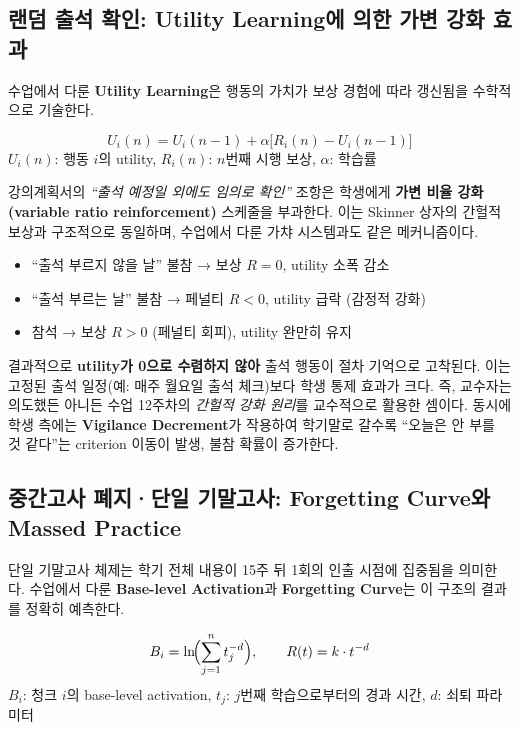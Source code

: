 \documentclass[a4paper,11pt]{article}
\begin{document}
\subsection{랜덤 출석 확인: Utility Learning에 의한 가변 강화 효과}

수업에서 다룬 \textbf{Utility Learning}은 행동의 가치가 보상 경험에 따라 갱신됨을
수학적으로 기술한다.

\begin{tcolorbox}[mybox=mainblue, title={Utility Learning}]
\[
  U_i(n) = U_i(n-1) + \alpha\bigl[R_i(n) - U_i(n-1)\bigr]
\]
$U_i(n)$: 행동 $i$의 utility, $R_i(n)$: $n$번째 시행 보상, $\alpha$: 학습률
\end{tcolorbox}

\noindent
강의계획서의 \textit{``출석 예정일 외에도 임의로 확인''} 조항은 학생에게
\textbf{가변 비율 강화(variable ratio reinforcement)} 스케줄을 부과한다. 이는 Skinner
상자의 간헐적 보상과 구조적으로 동일하며, 수업에서 다룬 가챠 시스템과도 같은 메커니즘이다.

\begin{itemize}[leftmargin=1.5em, itemsep=1pt]
  \item ``출석 부르지 않을 날'' 불참 → 보상 $R=0$, utility 소폭 감소
  \item ``출석 부르는 날'' 불참 → 페널티 $R<0$, utility 급락 (감정적 강화)
  \item 참석 → 보상 $R>0$ (페널티 회피), utility 완만히 유지
\end{itemize}

결과적으로 \textbf{utility가 0으로 수렴하지 않아} 출석 행동이 절차 기억으로 고착된다.
이는 고정된 출석 일정(예: 매주 월요일 출석 체크)보다 학생 통제 효과가 크다. 즉, 교수자는
의도했든 아니든 수업 12주차의 \textit{간헐적 강화 원리}를 교수적으로 활용한 셈이다.
동시에 학생 측에는 \textbf{Vigilance Decrement}가 작용하여 학기말로 갈수록
``오늘은 안 부를 것 같다''는 criterion 이동이 발생, 불참 확률이 증가한다.

\subsection{중간고사 폐지·단일 기말고사: Forgetting Curve와 Massed Practice}

단일 기말고사 체제는 학기 전체 내용이 15주 뒤 1회의 인출 시점에 집중됨을 의미한다.
수업에서 다룬 \textbf{Base-level Activation}과 \textbf{Forgetting Curve}는 이 구조의
결과를 정확히 예측한다.

\begin{tcolorbox}[mybox=mainblue, title={Memory Activation \& Forgetting}]
\[
  B_i = \ln\!\Bigl(\sum_{j=1}^{n} t_j^{-d}\Bigr), \qquad R(t) = k \cdot t^{-d}
\]
$B_i$: 청크 $i$의 base-level activation, $t_j$: $j$번째 학습으로부터의 경과 시간,
$d$: 쇠퇴 파라미터
\end{tcolorbox}
\end{document}
